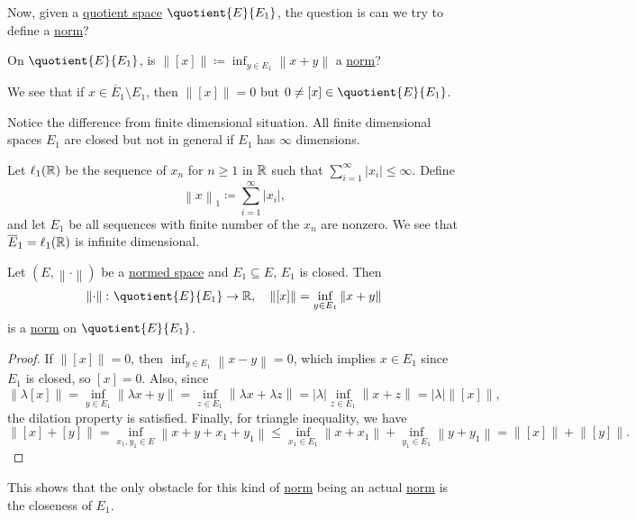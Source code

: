 Now, given a \hyperref[def:quotient-space]{quotient space} \(\quotient{E}{E_1} \), the question is can we try to define a \hyperref[def:norm]{norm}?

\begin{problem}
On \(\quotient{E}{E_1} \), is \(\left\lVert [x]\right\rVert \coloneqq \inf _{y\in E_1} \left\lVert x+y\right\rVert \) a \hyperref[def:norm]{norm}?
\end{problem}
\begin{answer}
	We see that if \(x\in \overline{E}_1 \setminus E_1 \), then \(\left\lVert [x]\right\rVert = 0\) but \(0 \neq [x]\in \quotient{E}{E_1} \).
\end{answer}

\begin{note}
	Notice the difference from finite dimensional situation. All finite dimensional spaces \(E_1\) are closed but not in general if \(E_1\) has \(\infty \) dimensions.
\end{note}
\begin{eg}
	Let \(\ell _1(\mathbb{\MakeUppercase{r}} )\) be the sequence of \(x_n\) for \(n \geq 1\) in \(\mathbb{\MakeUppercase{r}} \) such that \(\sum_{i=1}^{\infty} \left\vert x_i \right\vert \leq \infty\). Define
	\[
		\left\lVert x\right\rVert _1 \coloneqq \sum_{i=1}^{\infty} \left\vert x_i \right\vert ,
	\]
	and let \(E_1\) be all sequences with finite number of the \(x_n\) are nonzero. We see that \(\overline{E}_1= \ell _1(\mathbb{\MakeUppercase{r}} ) \) is infinite dimensional.
\end{eg}

\begin{proposition}
	Let \((E, \left\lVert \cdot\right\rVert)\) be a \hyperref[def:normed-vector-space]{normed space} and \(E_1\subseteq E\), \(E_1\) is closed. Then
	\[
		\left\lVert \cdot\right\rVert \colon \quotient{E}{E_1} \to \mathbb{\MakeUppercase{r}},\quad \left\lVert [x]\right\rVert = \inf _{y\in E_1} \left\lVert x+y\right\rVert
	\]
	is a \hyperref[def:norm]{norm} on \(\quotient{E}{E_1} \).
\end{proposition}
\begin{proof}
	If \(\left\lVert [x]\right\rVert = 0\), then \(\inf _{y\in E_1}\left\lVert x-y\right\rVert = 0\), which implies \(x\in E_1\) since \(E_1\) is closed, so \([x] = 0\). Also, since
	\[
		\left\lVert \lambda [x]\right\rVert = \inf _{y\in E_1}\left\lVert \lambda x + y\right\rVert = \inf _{z\in E_1}\left\lVert \lambda x + \lambda z\right\rVert = \left\vert \lambda  \right\vert \inf _{z\in E_1} \left\lVert x+z\right\rVert = \left\vert \lambda  \right\vert \left\lVert [x]\right\rVert,
	\]
	the dilation property is satisfied. Finally, for triangle inequality, we have
	\[
		\left\lVert [x] + [y]\right\rVert = \inf _{x_1, y_1 \in E} \left\lVert x+y + x_1 + y_1\right\rVert \leq \inf _{x_1\in E_1}\left\lVert x + x_1\right\rVert + \inf _{y_1\in E_1}\left\lVert y + y_1\right\rVert = \left\lVert [x]\right\rVert + \left\lVert [y]\right\rVert.
	\]
\end{proof}
\begin{remark}
	This shows that the only obstacle for this kind of \hyperref[def:norm]{norm} being an actual \hyperref[def:norm]{norm} is the closeness of \(E_1\).
\end{remark}

